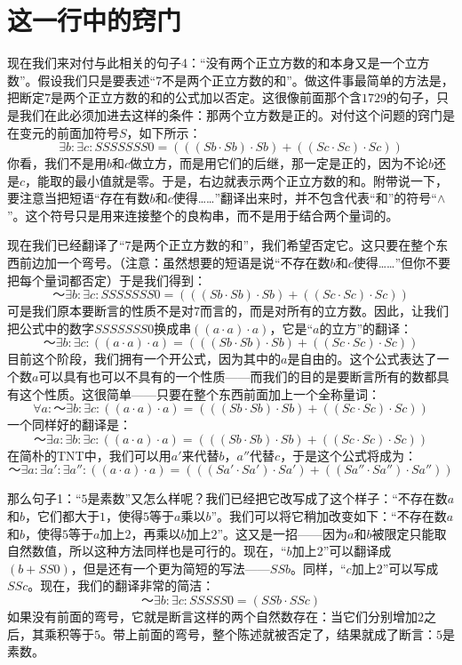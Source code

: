 \section{这一行中的窍门}

现在我们来对付与此相关的句子4：“没有两个正立方数的和本身又是一个立方数”。假设我们只是要表述“$7$不是两个正立方数的和”。做这件事最简单的方法是，把断定$7$是两个正立方数的和的公式加以否定。这很像前面那个含$1729$的句子，只是我们在此必须加进去这样的条件：那两个立方数是正的。对付这个问题的窍门是在变元的前面加符号$S$，如下所示：
\[
\exists b:\exists c:SSSSSSS0
  =(((Sb\cdot Sb)\cdot Sb)+((Sc\cdot Sc)\cdot Sc))
\]
你看，我们不是用$b$和$c$做立方，而是用它们的后继，那一定是正的，因为不论$b$还是$c$，能取的最小值就是零。于是，右边就表示两个正立方数的和。附带说一下，要注意当把短语“存在有数$b$和$c$使得……”翻译出来时，并不包含代表“和”的符号“$∧$”。这个符号只是用来连接整个的良构串，而不是用于结合两个量词的。

现在我们已经翻译了“$7$是两个正立方数的和”，我们希望否定它。这只要在整个东西前边加一个弯号。（注意：虽然想要的短语是说“不存在数$b$和$c$使得……”但你不要把每个量词都否定）于是我们得到：
\[
～\exists b:\exists c:SSSSSSS0
  =(((Sb\cdot Sb)\cdot Sb)+((Sc\cdot Sc)\cdot Sc))
\]
可是我们原本要断言的性质不是对$7$而言的，而是对所有的立方数。因此，让我们把公式中的数字$SSSSSSS0$换成串$((a\cdot a)\cdot a)$，它是“$a$的立方”的翻译：
\[
～\exists b:\exists c:((a\cdot a)\cdot a)
  =(((Sb\cdot Sb)\cdot Sb)+((Sc\cdot Sc)\cdot Sc))
\]
目前这个阶段，我们拥有一个开公式，因为其中的$a$是自由的。这个公式表达了一个数$a$可以具有也可以不具有的一个性质——而我们的目的是要断言所有的数都具有这个性质。这很简单——只要在整个东西前面加上一个全称量词：
\[
\forall a:～\exists b:\exists c:((a\cdot a)\cdot a)
  =(((Sb\cdot Sb)\cdot Sb)+((Sc\cdot Sc)\cdot Sc))
\]
一个同样好的翻译是：
\[
～\exists a:\exists b:\exists c:((a\cdot a)\cdot a)
  =(((Sb\cdot Sb)\cdot Sb)+((Sc\cdot Sc)\cdot Sc))
\]
在简朴的TNT中，我们可以用$a'$来代替$b$，$a''$代替$c$，于是这个公式将成为：
\[
～\exists a:\exists a':\exists a'':((a\cdot a)\cdot a)
  =(((Sa'\cdot Sa')\cdot Sa')+((Sa''\cdot Sa'')\cdot Sa''))
\]

那么句子1：“$5$是素数”又怎么样呢？我们已经把它改写成了这个样子：“不存在数$a$和$b$，它们都大于$1$，使得$5$等于$a$乘以$b$”。我们可以将它稍加改变如下：“不存在数$a$和$b$，使得$5$等于$a$加上$2$，再乘以$b$加上$2$”。这又是一招——因为$a$和$b$被限定只能取自然数值，所以这种方法同样也是可行的。现在，“$b$加上$2$”可以翻译成$(b+SS0)$，但是还有一个更为简短的写法——$SSb$。同样，“$c$加上$2$”可以写成$SSc$。现在，我们的翻译非常的简洁：
\[
～\exists b:\exists c:SSSSS0=(SSb\cdot SSc)
\]
如果没有前面的弯号，它就是断言这样的两个自然数存在：当它们分别增加$2$之后，其乘积等于$5$。带上前面的弯号，整个陈述就被否定了，结果就成了断言：$5$是素数。


